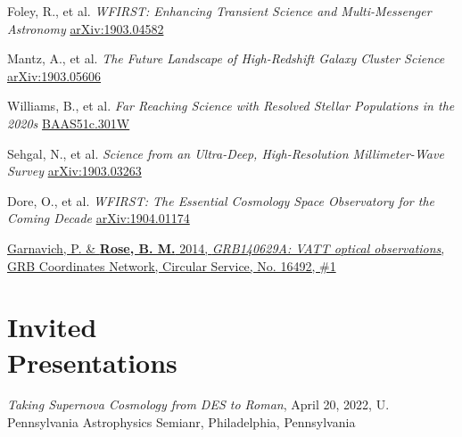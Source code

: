 \documentclass[margin]{res}
\begin{document}
\begin{resume}
\vspace{-12pt}\hspace{15pt}\hangindent=30pt 
Foley, R., et al. \textit{WFIRST: Enhancing Transient Science and Multi-Messenger Astronomy}
\href{https://ui.adsabs.harvard.edu/abs/2019arXiv190304582F/abstract}{arXiv:1903.04582}

\vspace{-12pt}\hspace{15pt}\hangindent=30pt
Mantz, A., et al. \textit{The Future Landscape of High-Redshift Galaxy Cluster Science}\\
\href{https://ui.adsabs.harvard.edu/abs/2019BAAS...51c.279M/abstract}{arXiv:1903.05606}

\vspace{-12pt}\hspace{15pt}\hangindent=30pt 
Williams, B., et al. \textit{Far Reaching Science with Resolved Stellar Populations in the 2020s}
\href{https://ui.adsabs.harvard.edu/abs/2019BAAS...51c.301W/abstract}{BAAS51c.301W}

\vspace{-12pt}\hspace{15pt}\hangindent=30pt 
Sehgal, N., et al. \textit{Science from an Ultra-Deep, High-Resolution Millimeter-Wave Survey}
\href{https://ui.adsabs.harvard.edu/abs/2019arXiv190303263S/abstract}{arXiv:1903.03263}

\vspace{-12pt}\hspace{15pt}\hangindent=30pt 
Dore, O., et al. \textit{WFIRST: The Essential Cosmology Space Observatory for the Coming Decade}
\href{https://ui.adsabs.harvard.edu/abs/2019arXiv190401174D/abstract}{arXiv:1904.01174}

\vspace{-12pt}
\hangindent=15pt \href{https://ui.adsabs.harvard.edu/abs/2014GCN..16492...1G/abstract}{Garnavich, P. \& {\bf Rose, B. M.} 2014, {\sl GRB140629A: VATT optical observations}, GRB Coordinates Network, Circular Service, No. 16492, \#1}




\section{Invited \\Presentations}

\hangindent=15pt 
\textit{Taking Supernova Cosmology from DES to Roman}, April 20, 2022, U. Pennsylvania Astrophysics Semianr, Philadelphia, Pennsylvania
\vspace{-12pt}


\end{resume}
\end{document}
